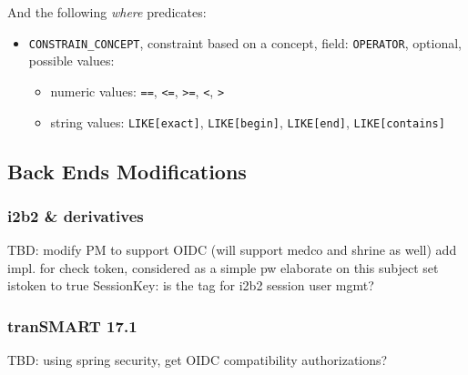 And the following \emph{where} predicates:
\begin{itemize}
    \item \verb|CONSTRAIN_CONCEPT|, constraint based on a concept, field:
    \verb|OPERATOR|, optional, possible values:
    \begin{itemize}
        \item numeric values: \verb|==|, \verb|<=|, \verb|>=|, \verb|<|, \verb|>|
        \item string values: \verb|LIKE[exact]|, \verb|LIKE[begin]|, \verb|LIKE[end]|, \verb|LIKE[contains]|
    \end{itemize}
\end{itemize}


\subsection{Back Ends Modifications}
\subsubsection{i2b2 \& derivatives}
TBD: modify PM to support OIDC (will support medco and shrine as well)
add impl. for check token, considered as a simple pw
elaborate on this subject
set istoken to true
SessionKey: is the tag for i2b2 session
user mgmt?

\subsubsection{tranSMART 17.1}
TBD: using spring security, get OIDC compatibility
authorizations?


